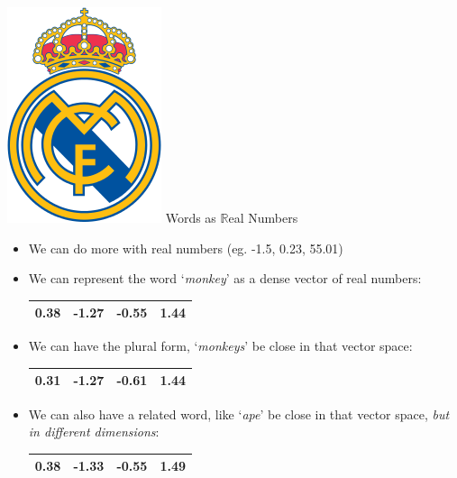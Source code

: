 \documentclass[xcolor=pdftex,x11names,table,hyperref]{beamer}
\begin{document}
\begin{frame}{\includegraphics[width=0.06\textheight]{images/real_madrid_cf.png} \hspace{1.5em} Words as $\mathbb{R}$eal Numbers}
\begin{itemize}
	\item We can do more with real numbers (eg. -1.5, 0.23, 55.01)
	\pause
	\item We can represent the word `\textit{monkey}' as a dense vector of real numbers: \\[0.4em]
		\begin{tabular}{|c|c|c|c|}
		    \hline
			0.38 & -1.27 & -0.55 & 1.44 \\
		    \hline
		\end{tabular}
	\pause
	\item We can have the plural form, `\textit{monkeys}' be close in that vector space: \\[0.4em]
		\begin{tabular}{|c|c|c|c|}
		    \hline
			\bf 0.31 & -1.27 & \bf -0.61 & 1.44 \\
		    \hline
		\end{tabular}
	\pause
	\item We can also have a related word, like `\textit{ape}' be close in that vector space, \emph{but in different dimensions}: \\[0.4em]
		\begin{tabular}{|c|c|c|c|}
		    \hline
			0.38 & \bf -1.33 & -0.55 & \bf 1.49 \\
		    \hline
		\end{tabular}
\end{itemize}
\end{frame}
\end{document}
